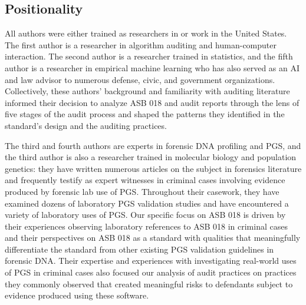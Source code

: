 \subsection{Positionality}
All authors were either trained as researchers in or work in the United States. The first author is a researcher in algorithm auditing and human-computer interaction. The second author is a researcher trained in statistics, and the fifth author is a researcher in empirical machine learning who has also served as an AI and law advisor to numerous defense, civic, and government organizations. Collectively, these authors' background and familiarity with auditing literature informed their decision to analyze ASB 018 and audit reports through the lens of five stages of the audit process and shaped the patterns they identified in the standard's design and the auditing practices.  

The third and fourth authors are experts in forensic DNA profiling and PGS, and the third author is also a researcher trained in molecular biology and population genetics: they have written numerous articles on the subject in forensics literature and frequently testify as expert witnesses in criminal cases involving evidence produced by forensic lab use of PGS. Throughout their casework, they have examined dozens of laboratory PGS validation studies and have encountered a variety of laboratory uses of PGS. Our specific focus on ASB 018 is driven by their experiences observing laboratory references to ASB 018 in criminal cases and their perspectives on ASB 018 as a standard with qualities that meaningfully differentiate the standard from other existing PGS validation guidelines in forensic DNA. Their expertise and experiences with investigating real-world uses of PGS in criminal cases also focused our analysis of audit practices on practices they commonly observed that created meaningful risks to defendants subject to evidence produced using these software.


